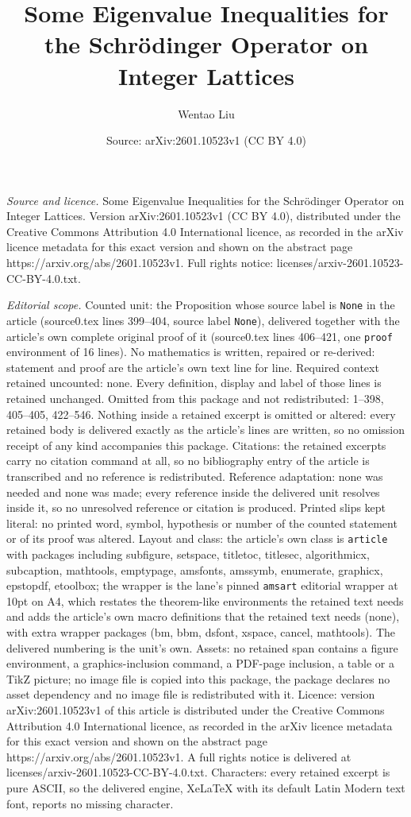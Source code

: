 \documentclass[10pt,a4paper]{amsart}
\title[Some Eigenvalue Inequalities for the Schr\"odinger Operator ]{Some Eigenvalue Inequalities for the Schr\"odinger Operator on Integer Lattices}
\author{Wentao Liu}
\date{Source: arXiv:2601.10523v1 (CC BY 4.0)}
\begin{document}
\maketitle

\noindent\emph{Source and licence.} Some Eigenvalue Inequalities for the Schr\"odinger Operator on Integer Lattices. Version arXiv:2601.10523v1 (CC BY 4.0), distributed under the Creative Commons Attribution 4.0 International licence, as recorded in the arXiv licence metadata for this exact version and shown on the abstract page https://arxiv.org/abs/2601.10523v1. Full rights notice: licenses/arxiv-2601.10523-CC-BY-4.0.txt.\par\smallskip

\noindent\textit{Editorial scope.} Counted unit: the Proposition whose source label is \texttt{None} in the article (source0.tex lines 399--404, source label \texttt{None}), delivered together with the article's own complete original proof of it (source0.tex lines 406--421, one \texttt{proof} environment of 16 lines). No mathematics is written, repaired or re-derived: statement and proof are the article's own text line for line. Required context retained uncounted: none. Every definition, display and label of those lines is retained unchanged. Omitted from this package and not redistributed: 1--398, 405--405, 422--546. Nothing inside a retained excerpt is omitted or altered: every retained body is delivered exactly as the article's lines are written, so no omission receipt of any kind accompanies this package. Citations: the retained excerpts carry no citation command at all, so no bibliography entry of the article is transcribed and no reference is redistributed. Reference adaptation: none was needed and none was made; every reference inside the delivered unit resolves inside it, so no unresolved reference or citation is produced. Printed slips kept literal: no printed word, symbol, hypothesis or number of the counted statement or of its proof was altered. Layout and class: the article's own class is \texttt{article} with packages including subfigure, setspace, titletoc, titlesec, algorithmicx, subcaption, mathtools, emptypage, amsfonts, amssymb, enumerate, graphicx, epstopdf, etoolbox; the wrapper is the lane's pinned \texttt{amsart} editorial wrapper at 10pt on A4, which restates the theorem-like environments the retained text needs and adds the article's own macro definitions that the retained text needs (none), with extra wrapper packages (bm, bbm, dsfont, xspace, cancel, mathtools). The delivered numbering is the unit's own. Assets: no retained span contains a figure environment, a graphics-inclusion command, a PDF-page inclusion, a table or a TikZ picture; no image file is copied into this package, the package declares no asset dependency and no image file is redistributed with it. Licence: version arXiv:2601.10523v1 of this article is distributed under the Creative Commons Attribution 4.0 International licence, as recorded in the arXiv licence metadata for this exact version and shown on the abstract page https://arxiv.org/abs/2601.10523v1. A full rights notice is delivered at licenses/arxiv-2601.10523-CC-BY-4.0.txt. Characters: every retained excerpt is pure ASCII, so the delivered engine, XeLaTeX with its default Latin Modern text font, reports no missing character.
\end{document}
